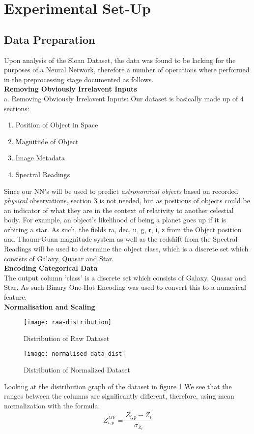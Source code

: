 \documentclass[conference]{IEEEtran}
\begin{document}
\section{Experimental Set-Up}

\subsection{Data Preparation}
Upon analysis of the Sloan Dataset, the data was found to be lacking for the purposes of a Neural Network, therefore a number of operations where performed in the preprocessing stage documented as follows.
\\
\textbf{Removing Obviously Irrelavent Inputs}\\
a. Removing Obviously Irrelavent Inputs:
Our dataset is basically made up of 4 sections:
\begin{enumerate}
	\item Position of Object in Space
	\item Magnitude of Object
	\item Image Metadata
	\item Spectral Readings
\end{enumerate}
Since our NN's will be used to predict \textit{astronomical objects} based on recorded \textit{physical} observations, section 3 is not needed, but as positions of objects could be an indicator of what they are in the context of relativity to another celestial body. For example, an object's likelihood of being a planet goes up if it is orbiting a star. As such, the fields ra, dec, u, g, r, i, z from the Object position and Thaum-Guan magnitude system as well as the redshift from the Spectral Readings will be used to determine the object class, which is a discrete set which consists of Galaxy, Quasar and Star.
\\
\textbf{Encoding Categorical Data}
\\
The output column 'class' is a discrete set which consists of Galaxy, Quasar and Star. As such Binary One-Hot Encoding was used to convert this to a numerical feature.
\\
\textbf{Normalisation and Scaling}
\\
\begin{figure}[h]
	\caption{Distribution of Raw Dataset}
	\texttt{[image: raw-distribution]}
	\centering
	\label{fig:dist-raw}
\end{figure}

\begin{figure}[h]
	\caption{Distribution of Normalized Dataset}
	\texttt{[image: normalised-data-dist]}
	\centering
	\label{fig:dist-normed}
\end{figure}
Looking at the distribution graph of the dataset in figure \ref{fig:dist-raw} We see that the ranges between the columns are significantly different, therefore, using mean normalization with the formula:
\begin{equation}
	Z^{MV}_{i,p} = \frac{Z_{i,p}-\bar{Z_i}}{\sigma_{Z_i}}
\end{equation}
\end{document}
